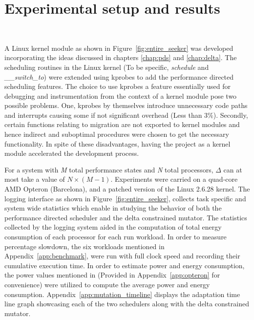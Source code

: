 \chapter{Experimental setup and results}~\label{chap:results}

A Linux kernel module as shown in Figure~\ref{fig:entire_seeker} was developed incorporating the ideas 
discussed in chapters \ref{chap:pds} and \ref{chap:delta}. 
The scheduling routines in the Linux kernel (To be specific, \textit{schedule} and \textit{\_\_switch\_to})
were extended using kprobes \cite{kprobes} to add the performance directed scheduling features.
The choice to use kprobes \cite{kprobes} a feature essentially used for debugging and instrumentation
from the context of a kernel module pose two possible 
problems. One, kprobes by themselves introduce unnecessary code paths and interrupts causing some
if not significant overhead (Less than 3\%). Secondly, certain functions relating to migration are not exported
to kernel modules and hence indirect and suboptimal procedures were chosen to get the necessary 
functionality. In spite of these disadvantages, having the project as a kernel module accelerated 
the development process. 

For a system with \textit{M} total performance states and \textit{N} total processors, $\Delta$ can 
at most take a value of $N \times (M-1)$. Experiments were carried on a quad-core AMD Opteron (Barcelona),
and a patched version of the Linux 2.6.28 kernel. The logging interface as shown in Figure~\ref{fig:entire_seeker},
collects task specific and system wide statistics which enable in studying the behavior of both the performance
directed scheduler and the delta constrained mutator. The statistics collected by the logging system aided in 
the computation of total energy consumption of each processor for each run workload. In order to measure 
percentage slowdown, the six workloads mentioned in Appendix~\ref{app:benchmark}, were run with full clock speed
and recording their cumulative execution time. In order to estimate power and energy consumption, the power 
values mentioned in \cite{AMDPow} (Provided in Appendix~\ref{app:opteron} for convenience) were utilized 
to compute the average power and energy consumption. Appendix~\ref{app:mutation_timeline} displays the 
adaptation time line graph showcasing each of the two schedulers along with the delta constrained mutator.

